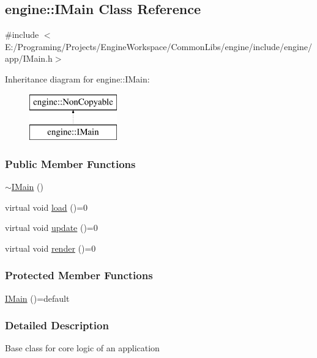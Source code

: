 \hypertarget{a00045}{}\subsection{engine\+:\+:I\+Main Class Reference}
\label{a00045}


{\ttfamily \#include $<$E\+:/\+Programing/\+Projects/\+Engine\+Workspace/\+Common\+Libs/engine/include/engine/app/\+I\+Main.\+h$>$}

Inheritance diagram for engine\+:\+:I\+Main\+:\begin{figure}[H]
\begin{center}
\leavevmode
\includegraphics[height=2.000000cm]{a00045}
\end{center}
\end{figure}
\subsubsection*{Public Member Functions}
\begin{DoxyCompactItemize}
\item 
\hyperlink{a00045_a3e512e4387b1517f99466e1eb01e0d78}{$\sim$\+I\+Main} ()
\item 
virtual void \hyperlink{a00045_aaddfdf70642e7bd6df3256e7074fa571}{load} ()=0
\item 
virtual void \hyperlink{a00045_a6ae095ca594d7ad67704efc97bb50adf}{update} ()=0
\item 
virtual void \hyperlink{a00045_abf626b47003850fbfb5fc334409c80ec}{render} ()=0
\end{DoxyCompactItemize}
\subsubsection*{Protected Member Functions}
\begin{DoxyCompactItemize}
\item 
\hyperlink{a00045_a7123c5ea514a788ba01089f3a257b72b}{I\+Main} ()=default
\end{DoxyCompactItemize}


\subsubsection{Detailed Description}
Base class for core logic of an application 

